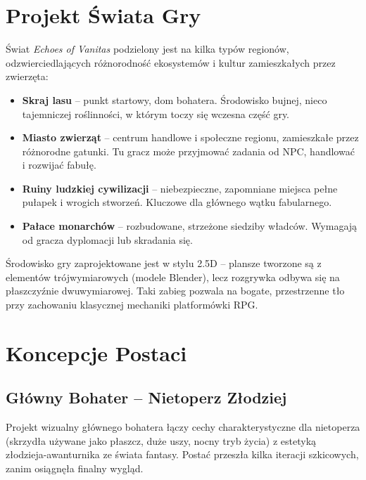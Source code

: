 \section{Projekt Świata Gry}

Świat \textit{Echoes of Vanitas} podzielony jest na kilka typów regionów, odzwierciedlających różnorodność ekosystemów i kultur zamieszkałych przez zwierzęta:

\begin{itemize}
    \item \textbf{Skraj lasu} – punkt startowy, dom bohatera. Środowisko bujnej, nieco tajemniczej roślinności, w którym toczy się wczesna część gry.
    \item \textbf{Miasto zwierząt} – centrum handlowe i społeczne regionu, zamieszkałe przez różnorodne gatunki. Tu gracz może przyjmować zadania od NPC, handlować i rozwijać fabułę.
    \item \textbf{Ruiny ludzkiej cywilizacji} – niebezpieczne, zapomniane miejsca pełne pułapek i wrogich stworzeń. Kluczowe dla głównego wątku fabularnego.
    \item \textbf{Pałace monarchów} – rozbudowane, strzeżone siedziby władców. Wymagają od gracza dyplomacji lub skradania się.
\end{itemize}

Środowisko gry zaprojektowane jest w stylu 2.5D – plansze tworzone są z elementów trójwymiarowych (modele Blender), lecz rozgrywka odbywa się na płaszczyźnie dwuwymiarowej. Taki zabieg pozwala na bogate, przestrzenne tło przy zachowaniu klasycznej mechaniki platformówki RPG.

\section{Koncepcje Postaci}

\subsection{Główny Bohater – Nietoperz Złodziej}

Projekt wizualny głównego bohatera łączy cechy charakterystyczne dla nietoperza (skrzydła używane jako płaszcz, duże uszy, nocny tryb życia) z estetyką złodzieja-awanturnika ze świata fantasy. Postać przeszła kilka iteracji szkicowych, zanim osiągnęła finalny wygląd.

